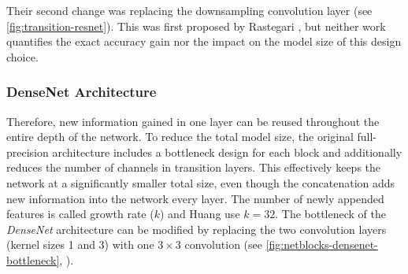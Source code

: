 \documentclass[10pt,twocolumn,letterpaper]{article}
\newcommand{\architecture}[1]{\emph{#1}}
\newcommand{\arch}[1]{\emph{#1}}
\begin{document}
Their second change was replacing the downsampling convolution layer (see \autoref{fig:transition-resnet}).
This was first proposed by Rastegari \etal\cite{Rastegari2016}, but neither work quantifies the exact accuracy gain nor the impact on the model size of this design choice.

\subsubsection{DenseNet Architecture}\label{sec:architectures-densenet}%
Therefore, new information gained in one layer can be reused throughout the entire depth of the network.
To reduce the total model size, the original full-precision architecture includes a bottleneck design for each block and additionally reduces the number of channels in transition layers.
This effectively keeps the network at a significantly smaller total size, even though the concatenation adds new information into the network every layer.
The number of newly appended features is called growth rate ($k$) and Huang \etal\cite{Huang2016} use $k=32$.
The bottleneck of the \arch{DenseNet} architecture can be modified by replacing the two convolution layers (kernel sizes 1 and 3) with one $3 \times 3$ convolution (see \autoref{fig:netblocks-densenet-bottleneck}, ). 
\end{document}
